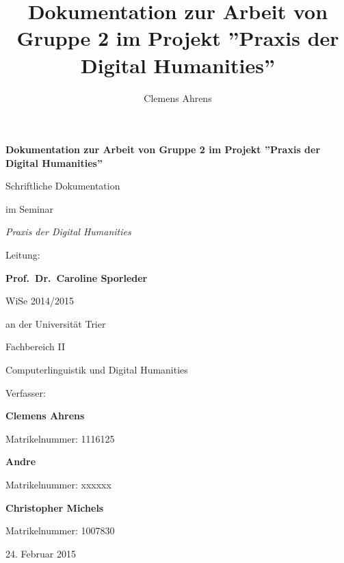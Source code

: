 \documentclass[a4paper,12pt,titlepage=true, ngerman]{scrartcl}
\title{Dokumentation zur Arbeit von Gruppe 2 im Projekt ''Praxis der Digital Humanities''} %
\author{Clemens Ahrens}
\begin{document}
\begin{titlepage}

\begin{center}

\vspace*{100pt}

\textbf{\Large{Dokumentation zur Arbeit von Gruppe 2 im Projekt ''Praxis der Digital Humanities''}}%

\vfill

Schriftliche Dokumentation

im Seminar

\emph{Praxis der Digital Humanities}


Leitung:

\textbf{Prof.\ Dr.\ Caroline Sporleder}%

WiSe 2014/2015%

\bigskip
\bigskip

an der Universität Trier

Fachbereich II

Computerlinguistik und Digital Humanities

\bigskip
\bigskip

Verfasser:


\textbf{Clemens Ahrens}

Matrikelnummer: 1116125

\textbf{Andre} %

Matrikelnummer: xxxxxx

\textbf{Christopher Michels}

Matrikelnummer: 1007830

\bigskip
\bigskip

24. Februar 2015

\vfill

\end{center}

\end{titlepage}







\newpage
\end{document}
